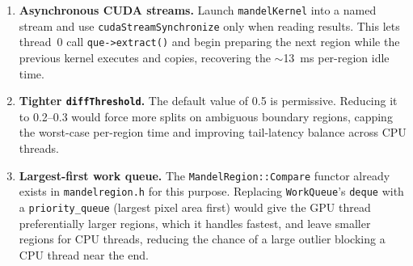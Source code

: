 \documentclass[
	english,
	letterpaper, oneside
]{article}
\begin{document}
\begin{enumerate}
    \item \textbf{Asynchronous CUDA streams.} Launch \texttt{mandelKernel}
    into a named stream and use \texttt{cudaStreamSynchronize} only when
    reading results. This lets thread~0 call \texttt{que->extract()} and
    begin preparing the next region while the previous kernel executes and
    copies, recovering the $\sim$13~ms per-region idle time.

    \item \textbf{Tighter \texttt{diffThreshold}.} The default value of 0.5
    is permissive. Reducing it to 0.2--0.3 would force more splits on
    ambiguous boundary regions, capping the worst-case per-region time and
    improving tail-latency balance across CPU threads.

    \item \textbf{Largest-first work queue.} The \texttt{MandelRegion::Compare}
    functor already exists in \texttt{mandelregion.h} for this purpose.
    Replacing \texttt{WorkQueue}'s \texttt{deque} with a \texttt{priority\_queue}
    (largest pixel area first) would give the GPU thread preferentially
    larger regions, which it handles fastest, and leave smaller regions for
    CPU threads, reducing the chance of a large outlier blocking a CPU
    thread near the end.
\end{enumerate}

\end{document}
